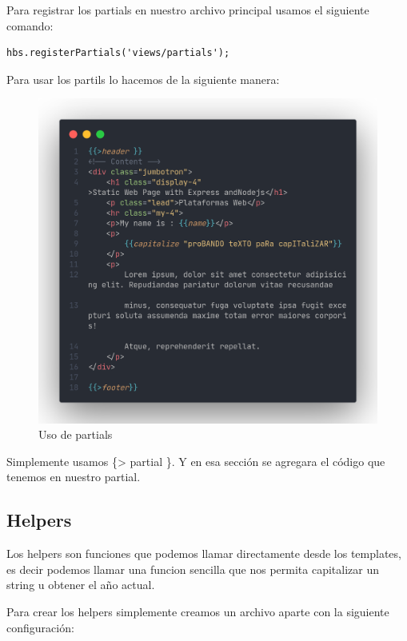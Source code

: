 \documentclass[12pt]{article}
\begin{document}
Para registrar los partials en nuestro archivo principal usamos el siguiente comando:

\begin{lstlisting}[numbers=none]
  hbs.registerPartials('views/partials');
\end{lstlisting}

Para usar los partils lo hacemos de la siguiente manera:

\begin{figure}[H]
  \centering
  \includegraphics[scale=.3]{assets/images/partial-use.png}
  \caption{Uso de partials}
\end{figure}

Simplemente usamos \{> partial \}. Y en esa sección se agregara el código que tenemos en nuestro partial.

\subsection{Helpers}

Los helpers son funciones que podemos llamar directamente desde los templates, es decir podemos llamar una funcion sencilla que nos permita capitalizar un string u obtener el año actual.

Para crear los helpers simplemente creamos un archivo aparte con la siguiente configuración:
\end{document}
